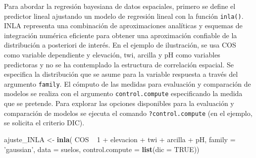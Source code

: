 \documentclass[11pt,b5paper,]{krantz}
\newenvironment{Shaded}{}{}
\newcommand{\DataTypeTok}[1]{\textcolor[rgb]{0.56,0.13,0.00}{#1}}
\newcommand{\DecValTok}[1]{\textcolor[rgb]{0.25,0.63,0.44}{#1}}
\newcommand{\KeywordTok}[1]{\textcolor[rgb]{0.00,0.44,0.13}{\textbf{#1}}}
\newcommand{\NormalTok}[1]{#1}
\newcommand{\OperatorTok}[1]{\textcolor[rgb]{0.40,0.40,0.40}{#1}}
\newcommand{\OtherTok}[1]{\textcolor[rgb]{0.00,0.44,0.13}{#1}}
\newcommand{\StringTok}[1]{\textcolor[rgb]{0.25,0.44,0.63}{#1}}
\begin{document}
Para abordar la regresión bayesiana de datos espaciales, primero se define el predictor lineal ajustando un modelo de regresión lineal con la función \texttt{inla()}. INLA representa una combinación de aproximaciones analíticas y esquemas de integración numérica eficiente para obtener una aproximación confiable de la distribución a posteriori de interés. En el ejemplo de ilustración, se usa COS como variable dependiente y elevación, twi, arcilla y pH como variables predictoras y no se ha contemplado la estructura de correlación espacial. Se especifica la distribución que se asume para la variable respuesta a través del argumento \texttt{family}. El cómputo de las medidas para evaluación y comparación de modelos se realiza con el argumento \texttt{control.compute} especificando la medida que se pretende. Para explorar las opciones disponibles para la evaluación y comparación de modelos se ejecuta el comando \texttt{?control.compute} (en el ejemplo, se solicita el criterio DIC).

\begin{Shaded}
\begin{Highlighting}[]
\NormalTok{ajuste_INLA <-}\StringTok{ }\KeywordTok{inla}\NormalTok{(}
\NormalTok{  COS }\OperatorTok{~}\StringTok{ }\DecValTok{1} \OperatorTok{+}\StringTok{ }\NormalTok{elevacion }\OperatorTok{+}\StringTok{ }\NormalTok{twi }\OperatorTok{+}\StringTok{ }\NormalTok{arcilla }\OperatorTok{+}\StringTok{ }\NormalTok{pH,}
  \DataTypeTok{family =} \StringTok{'gaussian'}\NormalTok{,}
  \DataTypeTok{data =}\NormalTok{ suelos,}
  \DataTypeTok{control.compute =} \KeywordTok{list}\NormalTok{(}\DataTypeTok{dic =} \OtherTok{TRUE}\NormalTok{))}
\end{Highlighting}
\end{Shaded}
\end{document}
